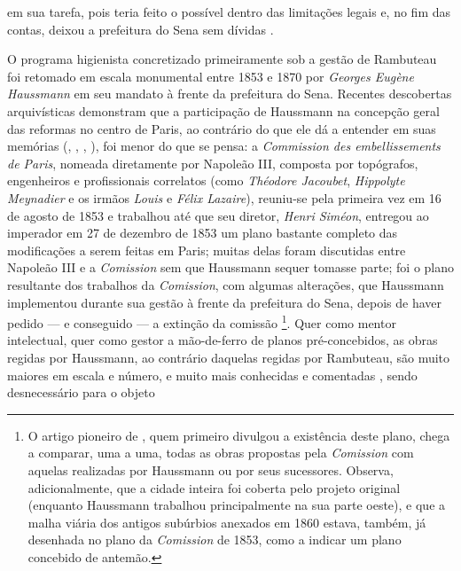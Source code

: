 em sua tarefa, pois teria feito o possível dentro das limitações legais e, no fim das contas, deixou a prefeitura do Sena sem dívidas \cite[p.~399]{rambuteau1905memoires}. 

O programa higienista concretizado primeiramente sob a gestão de Rambuteau foi retomado em escala monumental entre 1853 e 1870 por \textit{Georges Eugène Haussmann} em seu mandato à frente da prefeitura do Sena. Recentes descobertas arquivísticas demonstram que a participação de Haussmann na concepção geral das reformas no centro de Paris, ao contrário do que ele dá a entender em suas memórias (\citeauthor{haussmann1890memoires-1}, \citeyear{haussmann1890memoires-1}, \citeyear{haussmann1890memoires-2}, \citeyear{haussmann1890memoires-3}), foi menor do que se pensa: a \textit{Commission des embellissements de Paris}, nomeada diretamente por Napoleão III, composta por topógrafos, engenheiros e profissionais correlatos (como \textit{Théodore Jacoubet}, \textit{Hippolyte Meynadier} e os irmãos \textit{Louis} e \textit{Félix Lazaire}), reuniu-se pela primeira vez em 16 de agosto de 1853 e trabalhou até que seu diretor, \textit{Henri Siméon}, entregou ao imperador em 27 de dezembro de 1853 um plano bastante completo das modificações a serem feitas em Paris; muitas delas foram discutidas entre Napoleão III e a \textit{Comission} sem que Haussmann sequer tomasse parte; foi o plano resultante dos trabalhos da \textit{Comission}, com algumas alterações, que Haussmann implementou durante sua gestão à frente da prefeitura do Sena, depois de haver pedido --- e conseguido --- a extinção da comissão \cite{bourillon_changer_1999,casselle_embel_1997}\footnote{O artigo pioneiro de , quem primeiro divulgou a existência deste plano, chega a comparar, uma a uma, todas as obras propostas pela \textit{Comission} com aquelas realizadas por Haussmann ou por seus sucessores. Observa, adicionalmente, que a cidade inteira foi coberta pelo projeto original (enquanto Haussmann trabalhou principalmente na sua parte oeste), e que a malha viária dos antigos subúrbios anexados em 1860 estava, também, já desenhada no plano da \textit{Comission} de 1853, como a indicar um plano concebido de antemão.}. Quer como mentor intelectual, quer como gestor a mão-de-ferro de planos pré-concebidos, as obras regidas por Haussmann, ao contrário daquelas regidas por Rambuteau, são muito maiores em escala e número, e muito mais conhecidas e comentadas \cite{bourillon_changer_1999, casselle_embel_1997, dansette_haussmann_1972, faure_paris_2004, hourticq_haussmann_1971, petti_eurfranba_2011, pinkney_ordevpar_1955, pinkney_paris_1957, vossen_villes_1947}, sendo desnecessário para o objeto 